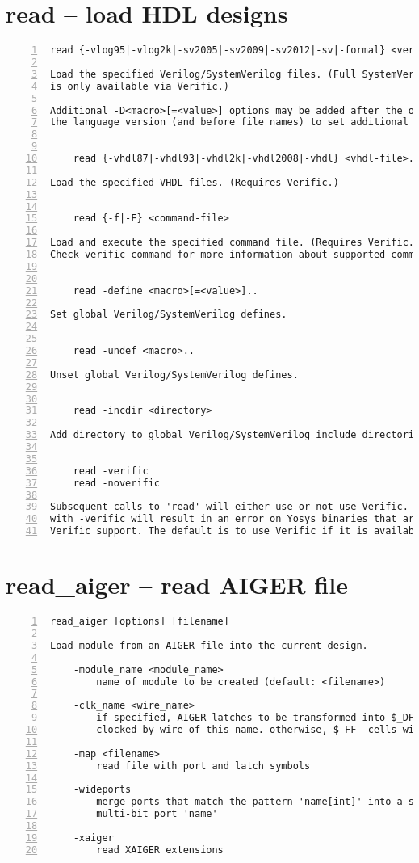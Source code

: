 \section{read -- load HDL designs}
\label{cmd:read}
\begin{lstlisting}[numbers=left,frame=single]
    read {-vlog95|-vlog2k|-sv2005|-sv2009|-sv2012|-sv|-formal} <verilog-file>..

Load the specified Verilog/SystemVerilog files. (Full SystemVerilog support
is only available via Verific.)

Additional -D<macro>[=<value>] options may be added after the option indicating
the language version (and before file names) to set additional verilog defines.


    read {-vhdl87|-vhdl93|-vhdl2k|-vhdl2008|-vhdl} <vhdl-file>..

Load the specified VHDL files. (Requires Verific.)


    read {-f|-F} <command-file>

Load and execute the specified command file. (Requires Verific.)
Check verific command for more information about supported commands in file.


    read -define <macro>[=<value>]..

Set global Verilog/SystemVerilog defines.


    read -undef <macro>..

Unset global Verilog/SystemVerilog defines.


    read -incdir <directory>

Add directory to global Verilog/SystemVerilog include directories.


    read -verific
    read -noverific

Subsequent calls to 'read' will either use or not use Verific. Calling 'read'
with -verific will result in an error on Yosys binaries that are built without
Verific support. The default is to use Verific if it is available.
\end{lstlisting}

\section{read\_aiger -- read AIGER file}
\label{cmd:read_aiger}
\begin{lstlisting}[numbers=left,frame=single]
    read_aiger [options] [filename]

Load module from an AIGER file into the current design.

    -module_name <module_name>
        name of module to be created (default: <filename>)

    -clk_name <wire_name>
        if specified, AIGER latches to be transformed into $_DFF_P_ cells
        clocked by wire of this name. otherwise, $_FF_ cells will be used

    -map <filename>
        read file with port and latch symbols

    -wideports
        merge ports that match the pattern 'name[int]' into a single
        multi-bit port 'name'

    -xaiger
        read XAIGER extensions
\end{lstlisting}

